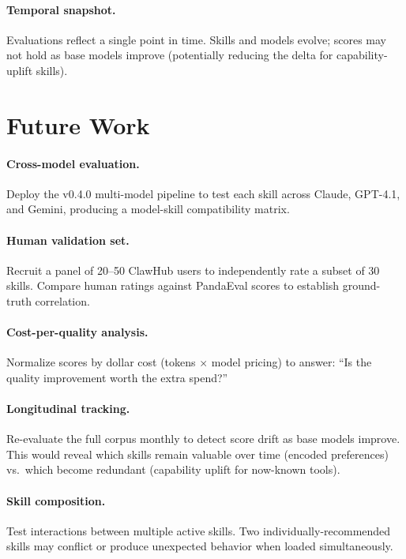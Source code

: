 \documentclass[11pt,a4paper]{article}
\begin{document}
\paragraph{Temporal snapshot.}
Evaluations reflect a single point in time. Skills and models evolve; scores may not hold as base models improve (potentially reducing the delta for capability-uplift skills).

\section{Future Work}
\label{sec:future}

\paragraph{Cross-model evaluation.}
Deploy the v0.4.0 multi-model pipeline to test each skill across Claude, GPT-4.1, and Gemini, producing a model-skill compatibility matrix.

\paragraph{Human validation set.}
Recruit a panel of 20--50 ClawHub users to independently rate a subset of 30 skills. Compare human ratings against PandaEval scores to establish ground-truth correlation.

\paragraph{Cost-per-quality analysis.}
Normalize scores by dollar cost (tokens $\times$ model pricing) to answer: ``Is the quality improvement worth the extra spend?''

\paragraph{Longitudinal tracking.}
Re-evaluate the full corpus monthly to detect score drift as base models improve. This would reveal which skills remain valuable over time (encoded preferences) vs.\ which become redundant (capability uplift for now-known tools).

\paragraph{Skill composition.}
Test interactions between multiple active skills. Two individually-recommended skills may conflict or produce unexpected behavior when loaded simultaneously.
\end{document}
